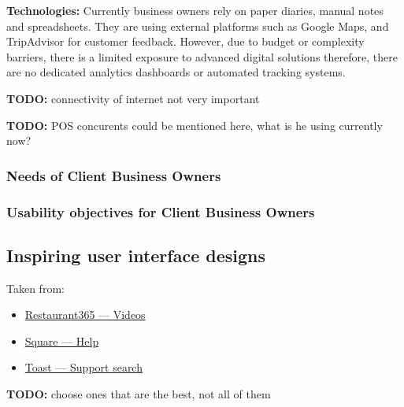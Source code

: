 \documentclass[]{VUMIFTemplateClass}
\newcommand{\todocomment}[1]{%
    \begin{tcolorbox}[colback=red!20, colframe=red!60, arc=0pt, outer arc=0pt, boxrule=1pt, left=3pt, right=3pt, top=3pt, bottom=3pt]
        \textbf{\textcolor{orange!70!black}{TODO:}} #1
    \end{tcolorbox}
}
\begin{document}
    \textbf{Technologies:} Currently business owners rely on paper diaries,
    manual notes and spreadsheets. They are using external platforms such as
    Google Maps, and TripAdvisor for customer feedback. However, due to budget
    or complexity barriers, there is a limited exposure to advanced digital
    solutions therefore, there are no dedicated analytics dashboards or
    automated tracking systems.

    \todocomment{connectivity of internet not very important}
    \todocomment{POS concurents could be mentioned here, what is he using currently now?}

\subsubsection{Needs of Client Business Owners}

\subsubsection{Usability objectives for Client Business Owners}

\subsection{Inspiring user interface designs}


Taken from:
\begin{itemize}
     \item \href{https://www.restaurant365.com/resource-category/videos/}{Restaurant365 — Videos}
     \item \href{https://squareup.com/help/us/en}{Square — Help}
     \item \href{https://support.toasttab.com/search/#f-100=Account%20Settings%20%26%20Billing,Marketing,Menu%20%26%20Items,POS%20%26%20Location%20Operations,Takeout%20%26%20Catering&f-@commonsource=Videos&f-@language=English}{Toast — Support search}
\end{itemize}

\todocomment{choose ones that are the best, not all of them}
\end{document}
